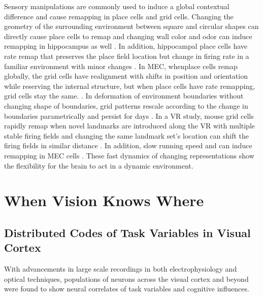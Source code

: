 Sensory manipulations are commonly used to induce a global contextual difference and cause remapping in place cells and grid cells. Changing the geometry of the surrounding environment between square and circular shapes can directly cause place cells to remap \cite{wills_attractor_2005} and changing wall color and odor can induce remapping in hippocampus as well \cite{anderson_heterogeneous_2003, zhang_spatial_2015}. In addition, hippocampal place cells have rate remap that preserves the place field location but change in firing rate in a familiar environment with minor changes \cite{fyhn_hippocampal_2007}. In MEC, whenplace cells remap globally, the grid cells have realignment with shifts in position and orientation while reserving the internal structure, but when place cells have rate remapping, grid cells stay the same. \cite{fyhn_hippocampal_2007}. In deformation of environment boundaries without changing shape of boundaries, grid patterns rescale according to the change in boundaries parametrically and persist for days \cite{barry_experience-dependent_2007}. In a VR study, mouse grid cells rapidly remap when novel landmarks are introduced along the VR with multiple stable firing fields and changing the same landmark set's location can shift the firing fields in similar distance \cite{wen_one-shot_2024}. In addition, slow running speed and can induce remapping in MEC cells \cite{low_dynamic_2021}. These fast dynamics of changing representations show the flexibility for the brain to act in a dynamic environment.

\section{When Vision Knows Where}
\subsection{Distributed Codes of Task Variables in Visual Cortex}
With advancements in large scale recordings in both electrophysiology and optical techniques, populations of neurons across the visual cortex and beyond were found to show neural correlates of task variables and cognitive influences.

